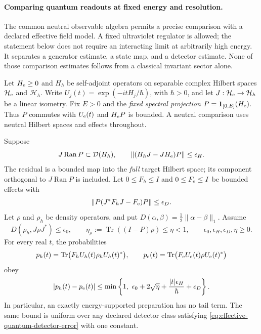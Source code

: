 \paragraph{Comparing quantum readouts at fixed energy and resolution.}
The common neutral observable algebra permits a precise comparison with a
declared effective field model. A fixed ultraviolet regulator is allowed;
the statement below does not require an interacting limit at arbitrarily
high energy. It separates a generator estimate, a state map, and a detector
estimate. None of those comparison estimates follows from a classical
invariant sector alone.

Let $H_{\rm e}\geq0$ and $H_h$ be self-adjoint operators on separable
complex Hilbert spaces $\mathcal H_{\rm e}$ and $\mathcal H_h$. Write
$U_j(t)=\exp(-itH_j/\hbar)$, with $\hbar>0$, and let
$J:\mathcal H_{\rm e}\to\mathcal H_h$ be a linear isometry. Fix $E>0$
and the \emph{fixed spectral projection}
$P=\mathbf1_{[0,E]}(H_{\rm e})$. Thus $P$ commutes with $U_{\rm e}(t)$
and $H_{\rm e}P$ is bounded. A neutral comparison uses neutral Hilbert
spaces and effects throughout.

\begin{theorem}
\label{thm:effective-quantum-comparison}
Suppose
\begin{equation}
 J\operatorname{Ran}P\subset\mathcal D(H_h),\qquad
 \|(H_hJ-JH_{\rm e})P\|\leq\epsilon_H.
 \label{eq:effective-quantum-full-residual}
\end{equation}
The residual is a bounded map into the \emph{full} target Hilbert space;
its component orthogonal to $J\operatorname{Ran}P$ is included. Let
$0\leq F_h\leq I$ and $0\leq F_{\rm e}\leq I$ be bounded effects with
\begin{equation}
 \|P(J^*F_hJ-F_{\rm e})P\|\leq\epsilon_D.
 \label{eq:effective-quantum-detector-error}
\end{equation}
Let $\rho$ and $\rho_h$ be density operators, and put
$D(\alpha,\beta)=\tfrac12\|\alpha-\beta\|_1$. Assume
\[
 D(\rho_h,J\rho J^*)\leq\epsilon_0,\qquad
 \eta_\rho:=\operatorname{Tr}((I-P)\rho)\leq\eta<1,
 \qquad \epsilon_0,\epsilon_H,\epsilon_D,\eta\geq0.
\]
For every real $t$, the probabilities
\[
 p_h(t)=\operatorname{Tr}\bigl(F_hU_h(t)\rho_hU_h(t)^*\bigr),\qquad
 p_{\rm e}(t)=\operatorname{Tr}\bigl(F_{\rm e}U_{\rm e}(t)
                                      \rho U_{\rm e}(t)^*\bigr)
\]
obey
\begin{equation}
 |p_h(t)-p_{\rm e}(t)|
 \leq\min\left\{1,\ \epsilon_0+2\sqrt\eta+
                  \frac{|t|\epsilon_H}{\hbar}+\epsilon_D\right\}.
 \label{eq:effective-quantum-probability-error}
\end{equation}
In particular, an exactly energy-supported preparation has no tail term.
The same bound is uniform over any declared detector class satisfying
\eqref{eq:effective-quantum-detector-error} with one constant.
\end{theorem}

